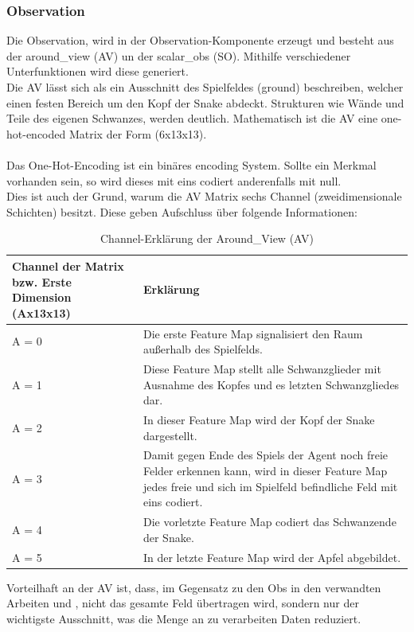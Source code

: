 \subsubsection{Observation} \label{sec:Konzept_Observation}
Die Observation, wird in der Observation-Komponente erzeugt und besteht aus der around\_view (AV) un der scalar\_obs (SO). Mithilfe verschiedener Unterfunktionen wird diese generiert.\\
Die AV lässt sich als ein Ausschnitt des Spielfeldes (ground) beschreiben, welcher einen festen Bereich um den Kopf der Snake abdeckt.
Strukturen wie Wände und Teile des eigenen Schwanzes, werden deutlich. Mathematisch ist die AV eine one-hot-encoded Matrix der Form (6x13x13).\\
\\Das One-Hot-Encoding ist ein binäres encoding System. Sollte ein Merkmal vorhanden sein, so wird dieses mit eins codiert anderenfalls mit null. \cite[S. 359 f.]{DRL_Lapan}\\
Dies ist auch der Grund, warum die AV Matrix sechs Channel (zweidimensionale Schichten) besitzt. Diese geben Aufschluss über folgende Informationen:
\begin{longtable}[h]{|p{4cm}|p{\linewidth - 5cm}|}
	\caption{Channel-Erklärung der Around\_View (AV)}
	\label{tab:around_view} 
	\endfirsthead
	\endhead
	\hline
	Channel der Matrix bzw. Erste Dimension (Ax13x13) & Erklärung \\
	\hline
	A = 0 & Die erste Feature Map signalisiert den Raum außerhalb des Spielfelds.\\
	\hline
	A = 1 & Diese Feature Map stellt alle Schwanzglieder mit Ausnahme des Kopfes und es letzten Schwanzgliedes dar. \\
	\hline
	A = 2 & In dieser Feature Map wird der Kopf der Snake dargestellt. \\
	\hline
	A = 3 & Damit gegen Ende des Spiels der Agent noch freie Felder erkennen kann, wird in dieser Feature Map jedes freie und sich im Spielfeld befindliche Feld mit eins codiert. \\
	\hline
	A = 4 & Die vorletzte Feature Map codiert das Schwanzende der Snake. \\
	\hline
	A = 5 & In der letzte Feature Map wird der Apfel abgebildet. \\
	\hline
\end{longtable}
Vorteilhaft an der AV ist, dass, im Gegensatz zu den Obs in den verwandten Arbeiten \cite{Autonomous_Agents_in_Snake_Game_via_DRL} und \cite{UAV}, nicht das gesamte Feld übertragen wird, sondern nur der wichtigste Ausschnitt, was die Menge an zu verarbeiten Daten reduziert.
